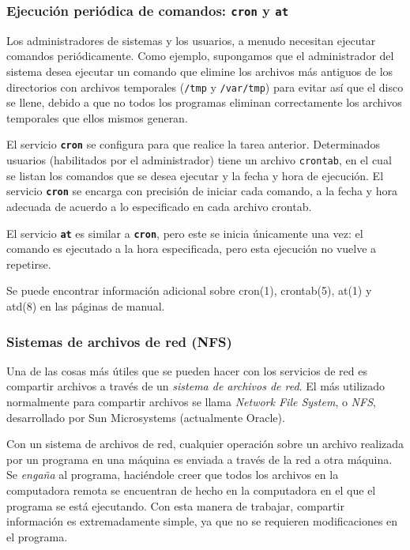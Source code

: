 \documentclass[12pt]{article}
\begin{document}
\subsubsection{Ejecución periódica de comandos: \texttt{\textbf{cron}} y
\texttt{\textbf{at}}}

 Los administradores de sistemas y los usuarios, a menudo necesitan
ejecutar comandos periódicamente. Como ejemplo, supongamos que el 
administrador del sistema desea ejecutar un comando que elimine los 
archivos más antiguos de los directorios con archivos temporales 
(\texttt{/tmp} y \texttt{/var/tmp}) para evitar así que el disco se 
llene, debido a que no todos los programas eliminan correctamente los 
archivos temporales que ellos mismos generan.  

 El servicio \texttt{\textbf{cron}} se configura para que realice la
tarea anterior. Determinados usuarios (habilitados por el administrador)
tiene un archivo \texttt{crontab}, en el cual se listan los comandos que
se desea ejecutar y la fecha y hora de ejecución. El servicio
 \texttt{\textbf{cron}} se encarga con precisión de iniciar cada comando,
a la fecha y hora adecuada de acuerdo a lo especificado en
cada archivo crontab.  

 El servicio \texttt{\textbf{at}} es similar a \texttt{\textbf{cron}},
pero este se inicia únicamente una vez: el comando es ejecutado a la hora
especificada, pero esta ejecución no vuelve a repetirse.  

 Se puede encontrar información adicional sobre cron(1), crontab(5), at(1)
y atd(8) en las páginas de manual.  


\subsubsection{ Sistemas de archivos de red (NFS)}  

Una de las cosas
más útiles que se pueden hacer con los servicios de red es compartir archivos a
través de un \textit{sistema de archivos de red}. El más utilizado
normalmente para compartir archivos se llama \textit{Network File
System}, o \textit{NFS}, desarrollado por Sun Microsystems (actualmente Oracle).  

 Con un sistema de archivos de red, cualquier operación sobre un archivo
realizada por un programa en una máquina es enviada a través de la red a otra
máquina. Se \textit{engaña} al programa, haciéndole creer que todos los archivos en la
computadora remota se encuentran de hecho en la computadora en el que el programa se
está ejecutando. Con esta manera de trabajar, compartir información es
extremadamente simple, ya que no se requieren modificaciones en el programa.
\end{document}
